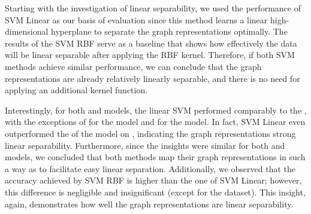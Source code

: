 Starting with the investigation of linear separability, we used the performance of \textsf{SVM Linear} as our basis of evaluation since this method learns a linear high-dimensional hyperplane to separate the graph representations optimally. The results of the \textsf{SVM RBF} serve as a baseline that shows how effectively the data will be linear separable after applying the \textsf{RBF} kernel. Therefore, if both \textsf{SVM} methods achieve similar performance, we can conclude that the graph representations are already relatively linearly separable, and there is no need for applying an additional kernel function.

Interestingly, for both \gnn and \wlnn models, the linear \textsf{SVM} performed comparably to the \mlp, with the exceptions of \enzymes for the \wlnn model and \nci for the \gnn model. In fact, \textsf{SVM Linear} even outperformed the \mlp of the \gnn model on \mutag, indicating the graph representations strong linear separability. Furthermore, since the insights were similar for both \gnn and \wlnn models, we concluded that both methods map their graph representations in such a way as to facilitate easy linear separation. Additionally, we observed that the accuracy achieved by \textsf{SVM RBF} is higher than the one of \textsf{SVM Linear}; however, this difference is negligible and insignificant (except for the \enzymes dataset). This insight, again, demonstrates how well the graph representations are linear separability.


